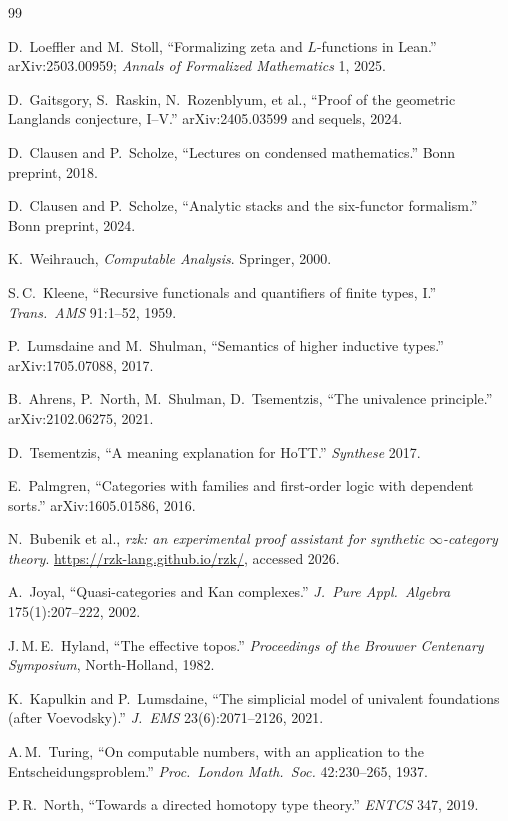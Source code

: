 \documentclass[12pt]{article}
\theoremstyle{definition}
\theoremstyle{remark}
\begin{document}
\begin{thebibliography}{99}

D.\ Loeffler and M.\ Stoll, ``Formalizing zeta and $L$-functions in
Lean.'' arXiv:2503.00959; \emph{Annals of Formalized Mathematics} 1,
2025.

D.\ Gaitsgory, S.\ Raskin, N.\ Rozenblyum, et al., ``Proof of the geometric
Langlands conjecture, I--V.'' arXiv:2405.03599 and sequels, 2024.

D.\ Clausen and P.\ Scholze, ``Lectures on condensed mathematics.'' Bonn
preprint, 2018.

D.\ Clausen and P.\ Scholze, ``Analytic stacks and the six-functor
formalism.'' Bonn preprint, 2024.


K.\ Weihrauch, \emph{Computable Analysis}. Springer, 2000.

S.\,C.\ Kleene, ``Recursive functionals and quantifiers of finite types,
I.'' \emph{Trans.\ AMS} 91:1--52, 1959.


P.\ Lumsdaine and M.\ Shulman, ``Semantics of higher inductive types.''
arXiv:1705.07088, 2017.

B.\ Ahrens, P.\ North, M.\ Shulman, D.\ Tsementzis, ``The univalence
principle.'' arXiv:2102.06275, 2021.

D.\ Tsementzis, ``A meaning explanation for HoTT.'' \emph{Synthese}
2017.

E.\ Palmgren, ``Categories with families and first-order logic with
dependent sorts.'' arXiv:1605.01586, 2016.

N.\ Bubenik et al., \emph{rzk: an experimental proof assistant for
synthetic $\infty$-category theory}.
\url{https://rzk-lang.github.io/rzk/}, accessed 2026.

A.\ Joyal, ``Quasi-categories and Kan complexes.''
\emph{J.\ Pure Appl.\ Algebra} 175(1):207--222, 2002.

J.\,M.\,E.\ Hyland, ``The effective topos.'' \emph{Proceedings of the
Brouwer Centenary Symposium}, North-Holland, 1982.

K.\ Kapulkin and P.\ Lumsdaine, ``The simplicial model of univalent
foundations (after Voevodsky).'' \emph{J.\ EMS} 23(6):2071--2126, 2021.

A.\,M.\ Turing, ``On computable numbers, with an application to the
Entscheidungsproblem.'' \emph{Proc.\ London Math.\ Soc.} 42:230--265,
1937.

P.\,R.\ North, ``Towards a directed homotopy type theory.''
\emph{ENTCS} 347, 2019.

\end{thebibliography}
\end{document}
